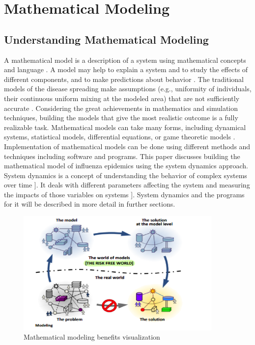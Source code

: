 \chapter{Mathematical Modeling}
\section{Understanding Mathematical Modeling}

A mathematical model is a description of a system using mathematical concepts and language \cite{per5}. A model may help to explain a system and to study the effects of different components, and to make predictions about behavior \cite{per6}. The traditional models of the disease spreading make assumptions (e.g., uniformity of individuals, their continuous uniform mixing at the modeled area) that are not sufficiently accurate \cite{per7}. Considering the great achievements in mathematics and simulation techniques, building the models that give the most realistic outcome is a fully realizable task. Mathematical models can take many forms, including dynamical systems, statistical models, differential equations, or game theoretic models \cite{per7}. Implementation of mathematical models can be done using different methods and techniques including software and programs. This paper discusses building the mathematical model of influenza epidemics using the system dynamics approach. System dynamics is a concept of understanding the behavior of complex systems over time \cite{per1}]. It deals with different parameters affecting the system and measuring the impacts of those variables on systems \cite{per1}]. System dynamics and the programs for it will be described in more detail in further sections.

\begin{figure}
   \centering
	\includegraphics[width=0.9\textwidth]{img/modeling}
	\caption[Clear]{Mathematical modeling benefits visualization}
\end{figure}


